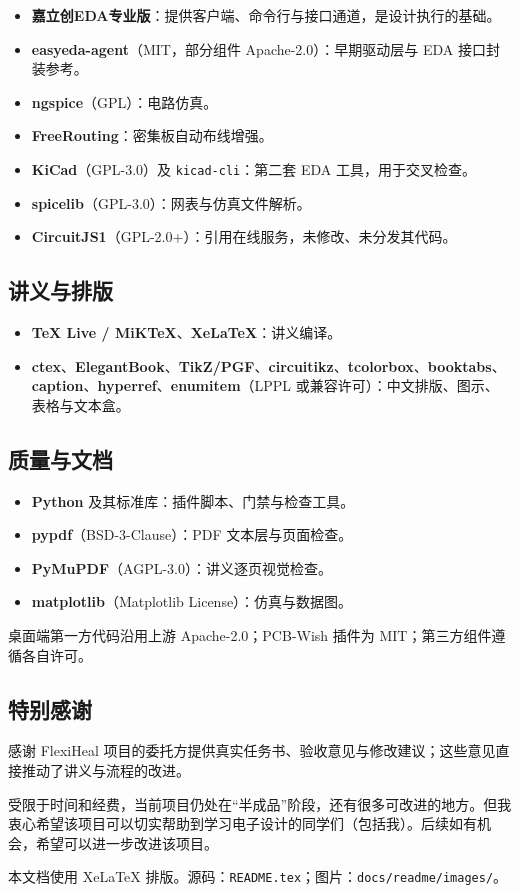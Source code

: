 \documentclass[11pt,a4paper]{ctexart}
\newcommand{\code}[1]{\texttt{\small #1}}
\begin{document}
\begin{itemize}
  \item \textbf{嘉立创EDA专业版}：提供客户端、命令行与接口通道，是设计执行的基础。
  \item \textbf{easyeda-agent}（MIT，部分组件 Apache-2.0）：早期驱动层与 EDA 接口封装参考。
  \item \textbf{ngspice}（GPL）：电路仿真。
  \item \textbf{FreeRouting}：密集板自动布线增强。
  \item \textbf{KiCad}（GPL-3.0）及 \code{kicad-cli}：第二套 EDA 工具，用于交叉检查。
  \item \textbf{spicelib}（GPL-3.0）：网表与仿真文件解析。
  \item \textbf{CircuitJS1}（GPL-2.0+）：引用在线服务，未修改、未分发其代码。
\end{itemize}

\subsection{讲义与排版}

\begin{itemize}
  \item \textbf{TeX Live / MiKTeX}、\textbf{XeLaTeX}：讲义编译。
  \item \textbf{ctex}、\textbf{ElegantBook}、\textbf{TikZ/PGF}、\textbf{circuitikz}、\textbf{tcolorbox}、\textbf{booktabs}、\textbf{caption}、\textbf{hyperref}、\textbf{enumitem}（LPPL 或兼容许可）：中文排版、图示、表格与文本盒。
\end{itemize}

\subsection{质量与文档}

\begin{itemize}
  \item \textbf{Python} 及其标准库：插件脚本、门禁与检查工具。
  \item \textbf{pypdf}（BSD-3-Clause）：PDF 文本层与页面检查。
  \item \textbf{PyMuPDF}（AGPL-3.0）：讲义逐页视觉检查。
  \item \textbf{matplotlib}（Matplotlib License）：仿真与数据图。
\end{itemize}

桌面端第一方代码沿用上游 Apache-2.0；PCB-Wish 插件为 MIT；第三方组件遵循各自许可。

\subsection{特别感谢}

感谢 FlexiHeal 项目的委托方提供真实任务书、验收意见与修改建议；这些意见直接推动了讲义与流程的改进。

受限于时间和经费，当前项目仍处在“半成品”阶段，还有很多可改进的地方。但我衷心希望该项目可以切实帮助到学习电子设计的同学们（包括我）。后续如有机会，希望可以进一步改进该项目。

\vspace{0.5em}
{\small\color{ink2} 本文档使用 XeLaTeX 排版。源码：\code{README.tex}；图片：\code{docs/readme/images/}。}
\end{document}
